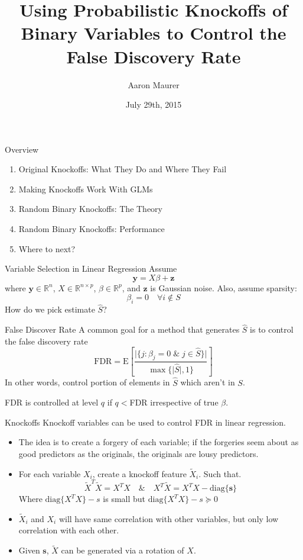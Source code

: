 \documentclass{beamer}
\title{Using Probabilistic Knockoffs of Binary Variables to Control the False Discovery Rate}
\author{Aaron Maurer}
\date{July 29th, 2015}
\newcommand{\R}{\mathbb{R}}
\newcommand{\E}{\mathrm{E}}
\newcommand{\diag}[1]{\mathrm{diag}\{#1\}}
\begin{document}
\begin{frame}[plain]
    \titlepage
\end{frame}

\begin{frame}{Overview}
    \begin{enumerate} 
        \item Original Knockoffs: What They Do and Where They Fail
        \item Making Knockoffs Work With GLMs
        \item Random Binary Knockoffs: The Theory
        \item Random Binary Knockoffs: Performance
        \item Where to next?
    \end{enumerate}
\end{frame}

\begin{frame}{Variable Selection in Linear Regression}
    Assume
     \[\mathbf{y} = X\beta + \mathbf{z}\]
    where $\mathbf{y}\in\R^n$, $X \in \R^{n\times p}$, $\beta\in\R^p$, and $\mathbf z$ is Gaussian noise. Also, assume sparsity:
    \[\beta_i = 0 \quad \forall i\not\in S\]
    How do we pick estimate $\hat S$?
\end{frame}

\begin{frame}{False Discover Rate}
    A common goal for a method that generates $\hat S$ is to control the false discovery rate
    \[ \textrm{FDR} = \E\left[\frac{\vert{\{j: \beta_j=0 \; \& \; j\in\hat S\}}\vert}{\max\{\vert{\hat S}\vert,1\}} \right] \]
    In other words, control portion of elements in $\hat S$ which aren't in $S$. \par
    \vspace{1cm}
    FDR is controlled at level $q$ if $q<$FDR irrespective of true $\beta$.
    
\end{frame}

\begin{frame}{Knockoffs}
    Knockoff variables can be used to control FDR in linear regression. 
    \begin{itemize}
        \item The idea is to create a forgery of each variable; if the forgeries seem about as good predictors as the originals, the originals are lousy predictors.
        \item For each variable $X_i$, create a knockoff feature $\tilde X_i$. Such that. 
            \[ \tilde X^T \tilde X = X^T X \quad \& \quad X^T \tilde X = X^T X - \diag{\mathbf s} \]
            Where $\diag{X^T X} - s$ is small but $\diag{X^T X} - s\succeq0$
        \item $\tilde X_i$ and $X_i$ will have same correlation with other variables, but only low correlation with each other.
        \item Given $\mathbf s$, $\tilde X$ can be generated via a rotation of $X$.
    \end{itemize}
\end{frame}
\end{document}
